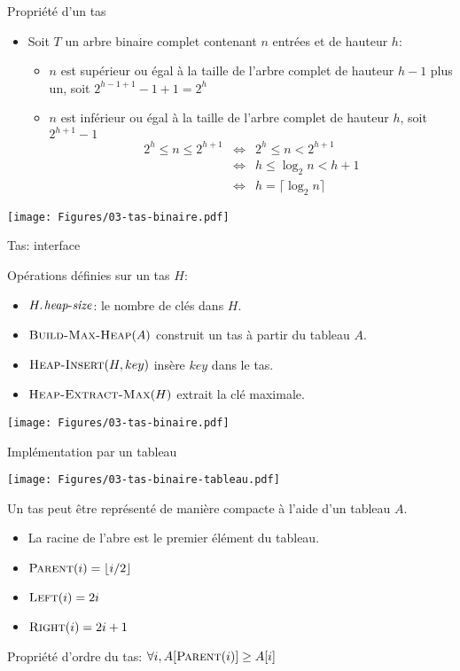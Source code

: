 \begin{frame}{Propriété d'un tas}
\label{03:hauteurtas}
\begin{itemize}
\item Soit $T$ un arbre binaire complet contenant $n$ entrées et de hauteur $h$:
\begin{itemize}
\item $n$ est supérieur ou égal à la taille de l'arbre complet de hauteur $h-1$ plus un, soit $2^{h-1+1}-1+1=2^h$
\item $n$ est inférieur ou égal à la taille de l'arbre complet de hauteur $h$, soit $2^{h+1}-1$
\begin{eqnarray*}
2^h\leq n\leq 2^{h+1} & \Leftrightarrow & 2^h\leq n < 2^{h+1}\\
& \Leftrightarrow & h \leq \log_2 n < h+1 \\
& \Leftrightarrow & h=\lceil \log_2 n\rceil
\end{eqnarray*}
\end{itemize}
\end{itemize}

\centerline{\texttt{[image: Figures/03-tas-binaire.pdf]}}

\end{frame}

\begin{frame}{Tas: interface}

Opérations définies sur un tas $H$:
\begin{itemize}
\item $\attrib{H}{heap-size}$: le nombre de clés dans $H$.
\item $\textnormal{\scshape Build-Max-Heap}(A)$ construit un tas à partir du tableau $A$.
\item $\textnormal{\scshape Heap-Insert}(H,key)$ insère $key$ dans le tas.
\item $\textnormal{\scshape Heap-Extract-Max}(H)$ extrait la clé maximale.
\end{itemize}

\bigskip

\centerline{\texttt{[image: Figures/03-tas-binaire.pdf]}}

\end{frame}

\begin{frame}{Implémentation par un tableau}

\centerline{\texttt{[image: Figures/03-tas-binaire-tableau.pdf]}}

\bigskip

Un tas peut être représenté de manière compacte à l'aide d'un tableau $A$.

\begin{itemize}
\item La racine de l'abre est le premier élément du tableau.
\item $\textnormal{\scshape Parent}(i)=\lfloor i/2\rfloor$
\item $\textnormal{\scshape Left}(i)=2i$
\item $\textnormal{\scshape Right}(i)=2i+1$
\end{itemize}

Propriété d'ordre du tas: $\forall i, A[\textnormal{\scshape Parent}(i)]\geq A[i]$

\end{frame}

